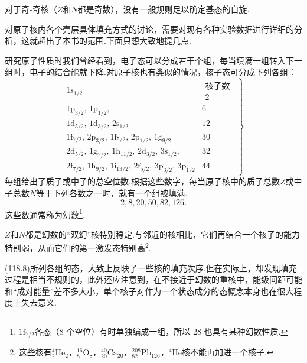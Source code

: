 对于奇-奇核（$Z$和$N$都是奇数），没有一般规则足以确定基态的自旋.

对原子核内各个壳层具体填充方式的讨论，需要对现有各种实验数据进行详细的分析，这就超出了本书的范围.下面只想大致地提几点.

研究原子性质时我们曾经看到，电子态可以分成若干个组，每当填满一组转入下一组时，电子的结合能就下降.对原子核也有类似的情况，核子态可分成下列各组：
\begin{equation}
  \left.
  \begin{array}{ll}
    1\mathrm{s}_{1/2}
    & \begin{array}{c}\text{核子数}\\ 2\end{array}\\
    1\mathrm{p}_{3/2},\,1\mathrm{p}_{1/2}, & 6\\
    1\mathrm{d}_{5/2},\,1\mathrm{d}_{3/2},\,2\mathrm{s}_{1/2} & 12\\
    1\mathrm{f}_{7/2},\,2\mathrm{p}_{3/2},\,1\mathrm{f}_{5/2},\,2\mathrm{p}_{1/2},\,1\mathrm{g}_{9/2} & 30\\
    2\mathrm{d}_{5/2},\,1\mathrm{g}_{7/2},\,1\mathrm{h}_{11/2},\,2\mathrm{d}_{3/2},\,3\mathrm{s}_{1/2}, & 32\\
    2\mathrm{f}_{7/2},\,1\mathrm{h}_{9/2},\,1\mathrm{i}_{13/2},\,2\mathrm{f}_{5/2},\,3\mathrm{p}_{3/2},\,3\mathrm{p}_{1/2} & 44
  \end{array}
  \right\}
\end{equation}
每组给出了质子或中子的总空位数.根据这些数字，每当原子核中的质子总数$Z$或中子总数$N$等于下列各数之一时，就有一个组被填满.
\begin{equation*}
  2,8,20,50,82,126.
\end{equation*}
这些数通常称为幻数\footnote{$1\mathrm{f}_{7/2}$各态（8 个空位）有时单独编成一组，所以 28 也具有某种幻数性质.}.

$Z$和$N$都是幻数的“双幻”核特别稳定.与邻近的核相比，它们再结合一个核子的能力特别弱，从而它们的第一激发态特别高\footnote{这些核有${}_2^4\mathrm{He}_2$，${}_8^{16}\mathrm{O}_8$，${}_{20}^{40}\mathrm{Ca}_{20}$，${}_{82}^{208}\mathrm{Pb}_{126}$，$^4\mathrm{He}$核不能再加进一个核子.}.

(118.8)所列各组的态，大致上反映了一些核的填充次序.但在实际上，却发现填充过程是相当不规则的，此外还应注意到，在不接近于幻数的重核中，能级间距可能和“成对能量”差不多大小，单个核子对作为一个状态成分的态概念本身也在很大程度上失去意义.

